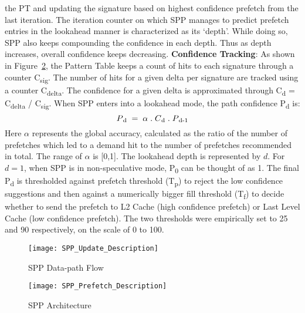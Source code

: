 the PT and updating the signature based on highest confidence
prefetch from the last iteration.  The iteration counter on which SPP
manages to predict prefetch entries in the lookahead manner is
characterized as its `depth'. While doing so, SPP also keeps
compounding the confidence in each depth. Thus as depth increases,
overall confidence keeps decreasing.
\newline
\newline
\noindent \textbf{Confidence Tracking}: As shown in
Figure~\ref{fig:spp_structure}, the Pattern Table keeps a count of
hits to each signature through a counter C\textsubscript{sig}. The
number of hits for a given delta per signature are tracked using a
counter C\textsubscript{delta}.  The confidence for a given delta is
approximated through C\textsubscript{d} = C\textsubscript{delta} /
C\textsubscript{sig}.  When SPP enters into a lookahead mode, the path
confidence P\textsubscript{d} is:
$$P\textsubscript{d} \;=\; \alpha  \;.\;  C\textsubscript{d}  \;.\;
P\textsubscript{d-1}$$ Here $\alpha$ represents the global accuracy,
calculated as the ratio of the number of prefetches which led to a
demand hit to the number of prefetches recommended in total. The range
of $\alpha$ is [0,1].  The lookahead depth is represented by $d$. 
For $d = 1$, when
SPP is in non-speculative mode, P\textsubscript{0} can be thought of
as 1.  The final P\textsubscript{d} is thresholded against prefetch
threshold (T\textsubscript{p}) to reject the low confidence
suggestions and then against a numerically bigger fill threshold
(T\textsubscript{f}) to decide whether to send the prefetch to
L2 Cache (high confidence prefetch) or Last Level Cache (low
confidence prefetch). The two thresholds were empirically set to 25
and 90 respectively, on the scale of 0 to 100.

\begin{figure}
  \begin{center}
  \texttt{[image: SPP\_Update\_Description]}
  \caption{SPP Data-path Flow}
  \label{fig:spp_update}
  \end{center}
\end{figure}


\begin{figure}
  \begin{center}
  \texttt{[image: SPP\_Prefetch\_Description]}
  \caption{SPP Architecture}
  \label{fig:spp_structure}
  \end{center}
\end{figure}

